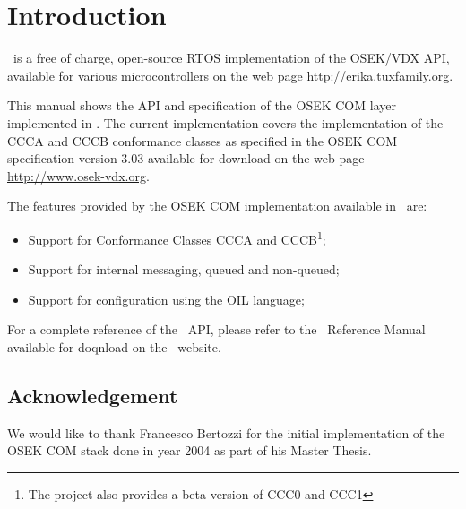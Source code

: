 \chapter{Introduction}

\ee\ is a free of charge, open-source RTOS implementation of the
OSEK/VDX API, available for various microcontrollers on the web page
\url{http://erika.tuxfamily.org}.

This manual shows the API and specification of the OSEK COM layer
implemented in \ee. The current implementation covers the
implementation of the CCCA and CCCB conformance classes as specified
in the OSEK COM specification version 3.03 available for download on
the web page \url{http://www.osek-vdx.org}.

The features provided by the OSEK COM implementation available in \ee\ are:

\begin{itemize}
\item Support for Conformance Classes CCCA and CCCB\footnote{The project also provides a beta version of CCC0 and CCC1};
\item Support for internal messaging, queued and non-queued;
\item Support for configuration using the OIL language;
\end{itemize}

For a complete reference of the \ee\ API, please refer to the
\ee\ Reference Manual available for doqnload on the \ee\ website.

\section{Acknowledgement}
We would like to thank Francesco Bertozzi for the initial
implementation of the OSEK COM stack done in year 2004 as part of his
Master Thesis.

